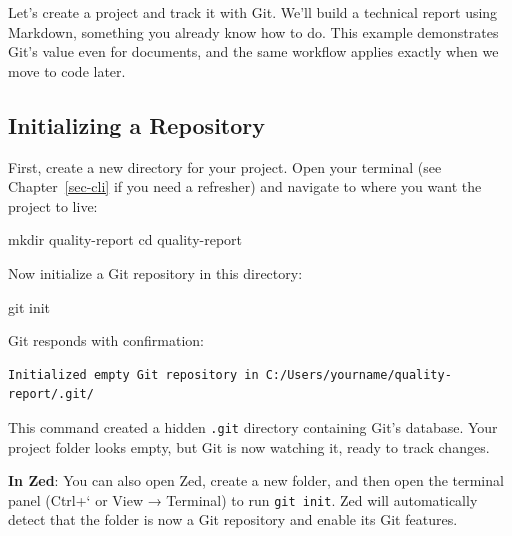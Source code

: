 \documentclass[
  letterpaper,
  DIV=11,
  numbers=noendperiod]{scrreprt}
\newenvironment{Shaded}{\begin{snugshade}}{\end{snugshade}}
\newcommand{\BuiltInTok}[1]{\textcolor[rgb]{0.00,0.23,0.31}{#1}}
\newcommand{\FunctionTok}[1]{\textcolor[rgb]{0.28,0.35,0.67}{#1}}
\newcommand{\NormalTok}[1]{\textcolor[rgb]{0.00,0.23,0.31}{#1}}
\begin{document}
Let's create a project and track it with Git. We'll build a technical
report using Markdown, something you already know how to do. This
example demonstrates Git's value even for documents, and the same
workflow applies exactly when we move to code later.

\subsection{Initializing a Repository}\label{initializing-a-repository}

First, create a new directory for your project. Open your terminal (see
Chapter~\ref{sec-cli} if you need a refresher) and navigate to where you
want the project to live:

\begin{codelisting}

\caption{\texttt{terminal}}

\begin{Shaded}
\begin{Highlighting}[]
\FunctionTok{mkdir}\NormalTok{ quality{-}report}
\BuiltInTok{cd}\NormalTok{ quality{-}report}
\end{Highlighting}
\end{Shaded}

\end{codelisting}

Now initialize a Git repository in this directory:

\begin{codelisting}

\caption{\texttt{terminal}}

\begin{Shaded}
\begin{Highlighting}[]
\FunctionTok{git}\NormalTok{ init}
\end{Highlighting}
\end{Shaded}

\end{codelisting}

Git responds with confirmation:

\begin{verbatim}
Initialized empty Git repository in C:/Users/yourname/quality-report/.git/
\end{verbatim}

This command created a hidden \texttt{.git} directory containing Git's
database. Your project folder looks empty, but Git is now watching it,
ready to track changes.

\textbf{In Zed}: You can also open Zed, create a new folder, and then
open the terminal panel (Ctrl+` or View → Terminal) to run
\texttt{git\ init}. Zed will automatically detect that the folder is now
a Git repository and enable its Git features.
\end{document}
